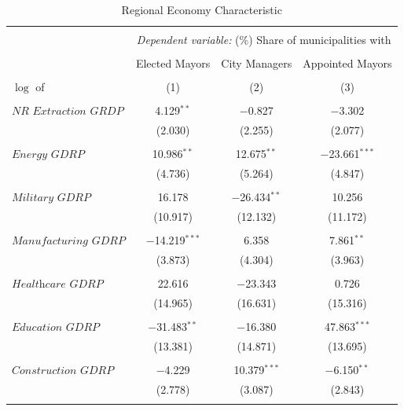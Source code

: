 \documentclass[12pt]{article}
\numberwithin{equation}{section}
\numberwithin{table}{section}
\numberwithin{figure}{section}
\begin{document}
\begin{table}[!htbp] \centering \footnotesize
\begin{threeparttable}
    \caption{Regional Economy Characteristic} 
    \label{tab:main_result} 
  \begin{tabular}{@{\extracolsep{5pt}}lccc} 
  \\[-1.8ex]\hline 
  \hline \\[-1.8ex] 
   & \multicolumn{3}{c}{\textit{Dependent variable:}  (\%) Share of municipalities with} \\ 
  \cline{2-4} 
  \\[-1.8ex] & Elected Mayors & City Managers & Appointed Mayors\\ 
  \\[-1.8ex] $\log$ of& (1) & (2) & (3)\\ 
  \hline \\[-1.8ex]
  $\textit{NR Extraction GRDP}$ & 4.129$^{**}$ & $-$0.827 & $-$3.302 \\ 
  & (2.030) & (2.255) & (2.077) \\ 
  & & & \\ 
  $\textit{Energy GDRP}$ & 10.986$^{**}$ & 12.675$^{**}$ & $-$23.661$^{***}$ \\ 
  & (4.736) & (5.264) & (4.847) \\ 
  & & & \\ 
 $\textit{Military GDRP}$ & 16.178 & $-$26.434$^{**}$ & 10.256 \\ 
  & (10.917) & (12.132) & (11.172) \\ 
  & & & \\ 
 $\textit{Manufacturing GDRP}$ & $-$14.219$^{***}$ & 6.358 & 7.861$^{**}$ \\ 
  & (3.873) & (4.304) & (3.963) \\ 
  & & & \\ 
 $\textit{Healthcare GDRP}$ & 22.616 & $-$23.343 & 0.726 \\ 
  & (14.965) & (16.631) & (15.316) \\ 
  & & & \\ 
 $\textit{Education GDRP}$ & $-$31.483$^{**}$ & $-$16.380 & 47.863$^{***}$ \\ 
  & (13.381) & (14.871) & (13.695) \\ 
  & & & \\ 
 $\textit{Construction GDRP}$ & $-$4.229 & 10.379$^{***}$ & $-$6.150$^{**}$ \\ 
  & (2.778) & (3.087) & (2.843) \\ 
  & & & \\ 

\end{tabular}
\end{threeparttable}
\end{table}
\end{document}
